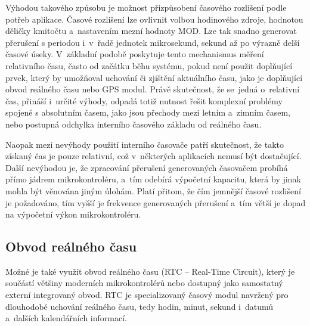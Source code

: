 Výhodou takového způsobu je možnost přizpůsobení časového rozlišení podle potřeb aplikace. Časové rozlišení lze ovlivnit volbou hodinového zdroje, hodnotou děličky kmitočtu a~nastavením mezní hodnoty MOD. Lze tak snadno generovat přerušení s periodou i~v~řadě jednotek mikrosekund, sekund až po výrazně delší časové úseky. V~základní podobě poskytuje tento mechanismus měření relativního času, často od začátku běhu systému, pokud není použit doplňující prvek, který by umožňoval uchování či zjištění aktuálního času, jako je doplňující obvod reálného času nebo GPS modul. Právě skutečnost, že se~jedná o~relativní čas, přináší i~určité výhody, odpadá totiž nutnost řešit komplexní problémy spojené s absolutním časem, jako jsou přechody mezi letním a~zimním časem, nebo postupná odchylka interního časového základu od reálného času.~\cite{perny2008zarizeni_cas_znacky}

Naopak mezi nevýhody použití interního časovače patří skutečnost, že takto získaný čas je pouze relativní, což v~některých aplikacích nemusí být dostačující. Další nevýhodou je, že zpracování přerušení generovaných časovačem probíhá přímo jádrem mikrokontroléru, a~tím odebírá výpočetní kapacitu, která by jinak mohla být věnována jiným úlohám. Platí přitom, že čím jemnější časové rozlišení je požadováno, tím vyšší je frekvence generovaných přerušení a~tím větší je dopad na výpočetní výkon mikrokontroléru.~\cite{perny2008zarizeni_cas_znacky}

\subsection{Obvod reálného času}
\label{real_time_circuit}
Možné je také využít obvod reálného času (RTC -- Real-Time Circuit), který je součástí většiny moderních mikrokontrolérů nebo dostupný jako samostatný externí integrovaný obvod. RTC je specializovaný časový modul navržený pro dlouhodobé uchování reálného času, tedy hodin, minut, sekund i~datumů a~dalších kalendářních informací.

